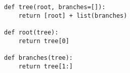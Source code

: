 \begin{lstlisting}
def tree(root, branches=[]):
    return [root] + list(branches)

def root(tree):
    return tree[0]

def branches(tree):
    return tree[1:]
\end{lstlisting}
